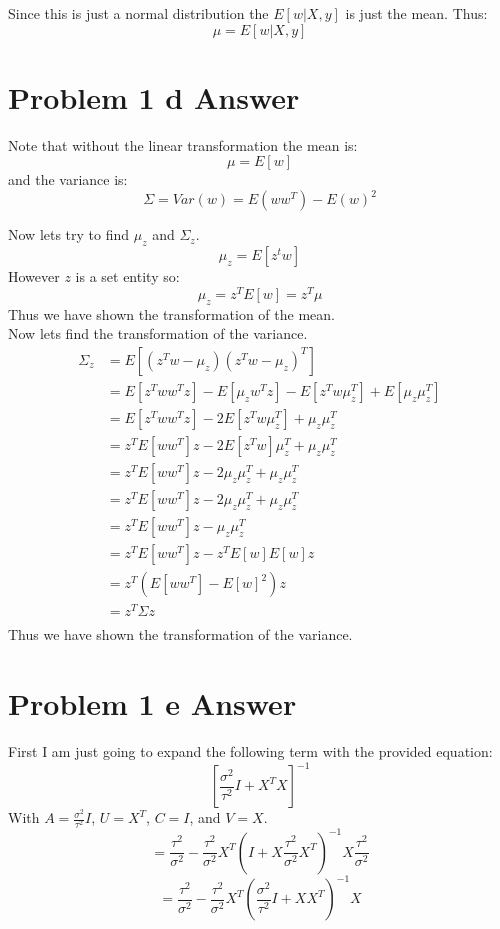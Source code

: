 \documentclass{article}
\newcommand{\1}{\mathbf{1}}
\begin{document}
Since this is just a normal distribution the $E[w|X,y]$ is just the mean. Thus:
$$ \mu = E[w|X,y] $$

\section*{Problem 1 d Answer}
Note that without the linear transformation the mean is: 
$$\mu = E[w]$$
and the variance is: 
$$ \Sigma =  Var(w) = E(ww^T) - E(w)^2$$

Now lets try to find $\mu_z$ and $\Sigma_z$.
$$ \mu_z = E[z^t w] $$
However $z$ is a set entity so:
$$ \mu_z = z^T E[w] = z^T \mu $$
Thus we have shown the transformation of the mean. \\

Now lets find the transformation of the variance. \\
\begin{align}
    \Sigma_z & = E[(z^Tw-\mu_z )(z^Tw-\mu_z)^T ] \\
    & = E[z^T w w^T z ] - E[ \mu_z w^T z ] - E[z^T w \mu_z^T ] + E[\mu_z \mu_z^T ] \\
    & = E[z^T w w^T z ] - 2  E[z^T w \mu_z^T ] +  \mu_z \mu_z^T  \\
    & = z^T E[ w w^T  ] z - 2  E[z^T w] \mu_z^T +  \mu_z \mu_z^T  \\
    & = z^T E[ w w^T  ] z - 2  \mu_z  \mu_z^T +  \mu_z \mu_z^T  \\
    & = z^T E[ w w^T  ] z - 2  \mu_z  \mu_z^T +  \mu_z \mu_z^T  \\
    & = z^T E[ w w^T  ] z -  \mu_z \mu_z^T  \\
    & = z^T E[ w w^T  ] z -  z^T E[w] E[w] z  \\
    & = z^T ( E[ w w^T  ] - E[w]^2 ) z  \\
    & = z^T \Sigma  z  \\
\end{align}
Thus we have shown the transformation of the variance. \\



\section*{Problem 1 e Answer}

First I am just going to expand the following term with the provided equation:
$$ [ \frac{\sigma^2}{\tau^2} I +X^T X ]^{-1}  $$
With $A=\frac{\sigma^2}{\tau^2} I $, $U=X^T$, $C=I$, and $V=X$. 
$$ =  \frac{\tau^2}{\sigma^2} - \frac{\tau^2}{\sigma^2} X^T( I + X \frac{\tau^2}{\sigma^2} X^T )^{-1} X \frac{\tau^2}{\sigma^2}   $$
$$ =  \frac{\tau^2}{\sigma^2} - \frac{\tau^2}{\sigma^2} X^T( \frac{\sigma^2}{\tau^2} I + X X^T )^{-1} X    $$
\end{document}
